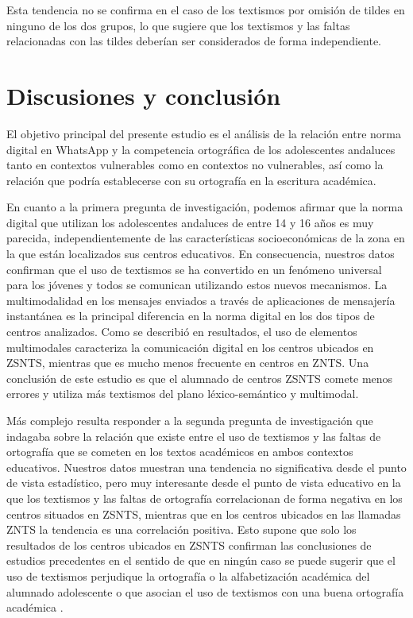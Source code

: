\documentclass[spanish]{textolivre}
\begin{document}
Esta tendencia no se confirma en el caso de los textismos por omisión de tildes en ninguno de los dos grupos, lo que sugiere que los textismos y las faltas relacionadas con las tildes deberían ser considerados de forma independiente. 



\section{Discusiones y conclusión}

El objetivo principal del presente estudio es el análisis de la relación entre norma digital en WhatsApp y la competencia ortográfica de los adolescentes andaluces tanto en contextos vulnerables como en contextos no vulnerables, así como la relación que podría establecerse con su ortografía en la escritura académica. 

En cuanto a la primera pregunta de investigación, podemos afirmar que la norma digital que utilizan los adolescentes andaluces de entre 14 y 16 años es muy parecida, independientemente de las características socioeconómicas de la zona en la que están localizados sus centros educativos. En consecuencia, nuestros datos confirman que el uso de textismos se ha convertido en un fenómeno universal para los jóvenes y todos se comunican utilizando estos nuevos mecanismos. La multimodalidad en los mensajes enviados a través de aplicaciones de mensajería instantánea es la principal diferencia en la norma digital en los dos tipos de centros analizados. Como se describió en resultados, el uso de elementos multimodales caracteriza la comunicación digital en los centros ubicados en ZSNTS, mientras que es mucho menos frecuente en centros en ZNTS. Una conclusión de este estudio es que el alumnado de centros ZSNTS comete menos errores y utiliza más textismos del plano léxico-semántico y multimodal.

Más complejo resulta responder a la segunda pregunta de investigación que indagaba sobre la relación que existe entre el uso de textismos y las faltas de ortografía que se cometen en los textos académicos en ambos contextos educativos. Nuestros datos muestran una tendencia no significativa desde el punto de vista estadístico, pero muy interesante desde el punto de vista educativo en la que los textismos y las faltas de ortografía correlacionan de forma negativa en los centros situados en ZSNTS, mientras que en los centros ubicados en las llamadas ZNTS la tendencia es una correlación positiva. Esto supone que solo los resultados de los centros ubicados en ZSNTS confirman las conclusiones de estudios precedentes en el sentido de que en ningún caso se puede sugerir que el uso de textismos perjudique la ortografía o la alfabetización académica del alumnado adolescente \cite{bernicot2014skilled,ouellette_generation_2016,van_dijk_influence_2016,wood_exploring_2014} o que asocian el uso de textismos con una buena ortografía académica \cite{de_jonge_textmessage_2012}.
\end{document}
